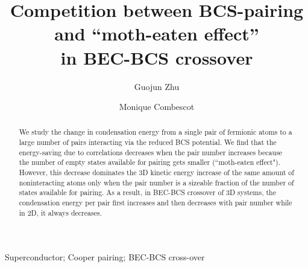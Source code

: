 \documentclass[5p,twocolumn]{elsarticle}
\begin{document}
\title{Competition between BCS-pairing and ``moth-eaten effect'' \\in BEC-BCS crossover}
\author[uiuc]{Guojun Zhu}
\author[uiuc,upmc]{Monique Combescot}
\address[uiuc]{Department of Physics, University of Illinois at Urbana-Champaign, 1110 W Green St, Urbana, IL, 61801}

\address[upmc]{Institut des NanoSciences de Paris, Universit\'{e} Pierre et Marie Curie, CNRS, Tour 22, 4 place Jussieu, 75005 Paris }
\newcommand{\vk}{\ensuremath{\mathbf{k}}}
\providecommand{\vr}{\ensuremath{\mathbf{r}}}
\newcommand{\vp}{\ensuremath{\mathbf{p}}}


\providecommand{\comm}[1]{\textit{\scriptsize \uwave{(#1)}}}
\newcommand{\td}{{\ensuremath{{\text{(2D)}}}}}
\newcommand{\sd}{{\ensuremath{{\text{(3D)}}}}}
\newcommand{\Arctg}{\ensuremath{\text{Arctg}}}



\begin{abstract}
We study the change in condensation energy from a single pair of fermionic atoms to a large number of pairs interacting via the reduced BCS potential. We find that the energy-saving due to correlations decreases when the pair number increases because the number of empty states available for pairing gets smaller (``moth-eaten effect"). However, this decrease  dominates the 3D kinetic energy increase of the same amount of noninteracting atoms only when the   pair number is a sizeable fraction of the number of states available for pairing. As a result, in  BEC-BCS crossover of 3D systems, the condensation energy per pair first increases and then decreases with pair number while in 2D, it always decreases.  
\end{abstract}
\begin{keyword}
Superconductor; Cooper pairing; BEC-BCS cross-over
\end{keyword}

\maketitle
\end{document}
